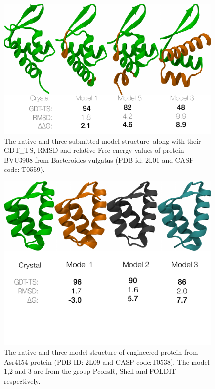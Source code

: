 \documentclass[12pt]{article}
\begin{document}
\begin{figure}
\begin{center}
\includegraphics[width=3.8 in,height=3.0 in]{T0559.pdf}
\end{center}
\caption{The native and three submitted model structure, along with their GDT\_TS, RMSD and relative Free energy values 
of protein BVU3908 from Bacteroides vulgatus (PDB id: 2L01 and CASP code: T0559).}
\label{fig:T0559}
\end{figure}

\begin{figure}
\begin{center}
\includegraphics[width=3.8 in,height=3.0 in]{T0538.pdf}
\end{center}
\caption{The native and three model structure of engineered protein from Asr4154 protein (PDB ID: 2L09 and CASP code:T0538). The model 1,2 and 3 are
from the group PconsR, Shell and FOLDIT respectively.}
\label{fig:T0538}
\end{figure}
\end{document}
